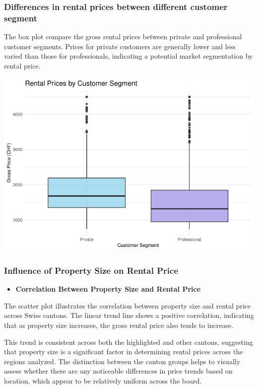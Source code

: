 \documentclass[
]{article}
\providecommand{\tightlist}{%
  \setlength{\itemsep}{0pt}\setlength{\parskip}{0pt}}
\begin{document}
\subsubsection{Differences in rental prices between different customer
segment}\label{differences-in-rental-prices-between-different-customer-segment}

The box plot compare the gross rental prices between private and
professional customer segments. Prices for private customers are
generally lower and less varied than those for professionals, indicating
a potential market segmentation by rental price.

\includegraphics{2024_groupXX_report_files/figure-latex/Differences in rental prices between different customer segment-1.pdf}

\subsubsection{Influence of Property Size on Rental
Price}\label{influence-of-property-size-on-rental-price}

\begin{itemize}
\tightlist
\item
  \textbf{Correlation Between Property Size and Rental Price}
\end{itemize}

The scatter plot illustrates the correlation between property size and
rental price across Swiss cantons. The linear trend line shows a
positive correlation, indicating that as property size increases, the
gross rental price also tends to increase.

This trend is consistent across both the highlighted and other cantons,
suggesting that property size is a significant factor in determining
rental prices across the regions analyzed. The distinction between the
canton groups helps to visually assess whether there are any noticeable
differences in price trends based on location, which appear to be
relatively uniform across the board.
\end{document}
